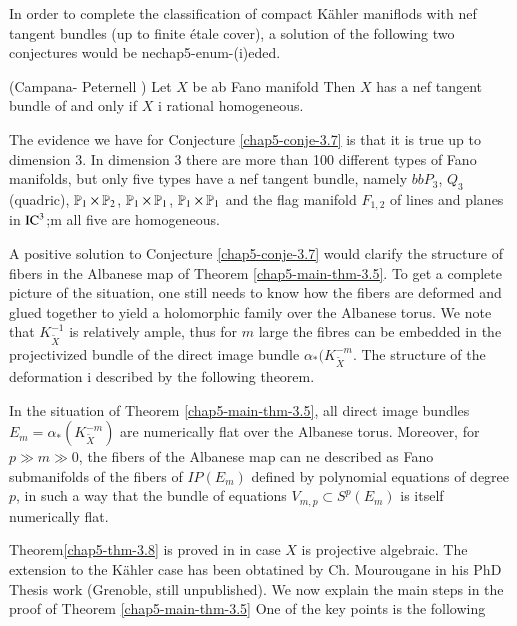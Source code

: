 In order to complete the classification of compact K\"ahler maniflods with nef tangent bundles (up to finite \'etale cover), a solution of the following two conjectures would be nechap5-enum-(i)eded.

\begin{secconj}\label{chap5-conje-3.7}
(Campana- Peternell \cite{chap5-keyCP91}) Let $X$ be ab Fano manifold Then $X$ has a nef tangent bundle of and only if $X$ i rational homogeneous.
\end{secconj}

The evidence we have for Conjecture \ref{chap5-conje-3.7} is that it is true up to dimension 3. In dimension 3 there are more than 100 different types of Fano manifolds, but only five types have a nef tangent bundle, namely $bbP_{3}$, $Q_{3}$ (quadric), $\mathbb{P}_{1}\times \mathbb{P}_{2}$, $\mathbb{P}_{1}\times \mathbb{P}_{1}$, $\mathbb{P}_{1}\times \mathbb{P}_{1}$ and the flag manifold $F_{1,2}$ of lines and planes in $\operatorname{IC}^{3}$;m all five are homogeneous.   

A positive solution to Conjecture \ref{chap5-conje-3.7} would clarify the structure of fibers in the Albanese map of Theorem \ref{chap5-main-thm-3.5}. To get a complete picture of the situation, one still needs to know how the fibers are deformed and glued together to yield a holomorphic family over the Albanese torus. We note that $K_{\widetilde{X}}^{-1}$ is relatively ample, thus for $m$ large the fibres can be embedded in the projectivized bundle of the direct image bundle $\alpha_{*}(K_{\widetilde{X}}^{-m}$. The structure of the deformation i described by the following theorem.

\begin{secthm}\label{chap5-thm-3.8}
In the situation of Theorem \ref{chap5-main-thm-3.5}, all direct image bundles $E_{m}= \alpha_{*}(K_{\widetilde{X}}^{-m})$ are numerically flat over the Albanese torus. Moreover, for $p \gg m \gg 0$, the fibers of the Albanese map can ne described as Fano submanifolds of the fibers of $IP(E_{m})$ defined by polynomial equations of degree $p$, in such a way that the bundle of equations $V_{m, p} \subset S^{p}(E_{m})$ is itself numerically flat.
\end{secthm}

Theorem\pageoriginale \ref{chap5-thm-3.8} is proved in \cite{chap5-keyDPS91} in case $X$ is projective algebraic. The extension to the K\"ahler case has been obtatined by Ch. Mourougane in his PhD Thesis work (Grenoble, still unpublished). We now explain the main steps in the proof of Theorem \ref{chap5-main-thm-3.5} One of the key points is the following

